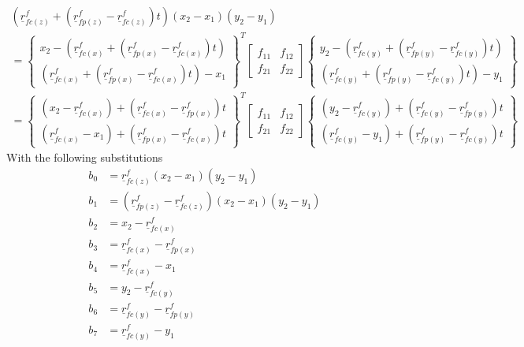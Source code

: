 \documentclass[
10pt, %
a4paper, %
oneside, %
headinclude,footinclude, %
BCOR5mm, %
]{scrartcl}
\begin{document}
\begin{equation}
  \label{eq:intersection-bilinear-patch-2}
\begin{split}
  (\underline{r}_{fc(z)}^f + (\underline{r}_{fp(z)}^f - \underline{r}_{fc(z)}^f)t) ( x_2 - x_1) ( y_2 - y_1) \\
  = \begin{Bmatrix}
    x_2 - (\underline{r}_{fc(x)}^f  + (\underline{r}_{fp(x)}^f - \underline{r}_{fc(x)}^f)t) \\
    (\underline{r}_{fc(x)}^f  + (\underline{r}_{fp(x)}^f - \underline{r}_{fc(x)}^f)t) - x_1
  \end{Bmatrix}^T
  \begin{bmatrix}
    f_{11} & f_{12}\\
    f_{21} & f_{22}
  \end{bmatrix}
  \begin{Bmatrix}
    y_2 - (\underline{r}_{fc(y)}^f + (\underline{r}_{fp(y)}^f - \underline{r}_{fc(y)}^f)t)\\
    (\underline{r}_{fc(y)}^f + (\underline{r}_{fp(y)}^f - \underline{r}_{fc(y)}^f)t) - y_1\end{Bmatrix}\\
    = \begin{Bmatrix}
      (x_2 - \underline{r}_{fc(x)}^f)  + (\underline{r}_{fc(x)}^f - \underline{r}_{fp(x)}^f)t \\
      (\underline{r}_{fc(x)}^f  - x_1) + (\underline{r}_{fp(x)}^f - \underline{r}_{fc(x)}^f)t
    \end{Bmatrix}^T
    \begin{bmatrix}
      f_{11} & f_{12}\\
      f_{21} & f_{22}
    \end{bmatrix}
    \begin{Bmatrix}
      (y_2 - \underline{r}_{fc(y)}^f) + (\underline{r}_{fc(y)}^f - \underline{r}_{fp(y)}^f)t\\
      (\underline{r}_{fc(y)}^f - y_1) + (\underline{r}_{fp(y)}^f - \underline{r}_{fc(y)}^f)t
    \end{Bmatrix}
\end{split}
\end{equation}
With the following substitutions
\begin{equation}
\begin{split}
  b_{0} &= \underline{r}_{fc(z)}^f ( x_2 - x_1) ( y_2 - y_1)\\
  b_{1} &= (\underline{r}_{fp(z)}^f - \underline{r}_{fc(z)}^f) ( x_2 - x_1) ( y_2 - y_1)\\
  b_{2} &= x_2 - \underline{r}_{fc(x)}^f\\
  b_{3} &= \underline{r}_{fc(x)}^f - \underline{r}_{fp(x)}^f\\
  b_{4} &= \underline{r}_{fc(x)}^f  - x_1\\
  b_{5} &= y_2 - \underline{r}_{fc(y)}^f\\
  b_{6} &= \underline{r}_{fc(y)}^f - \underline{r}_{fp(y)}^f\\
  b_{7} &= \underline{r}_{fc(y)}^f  - y_1
\end{split}
\end{equation}
\end{document}
